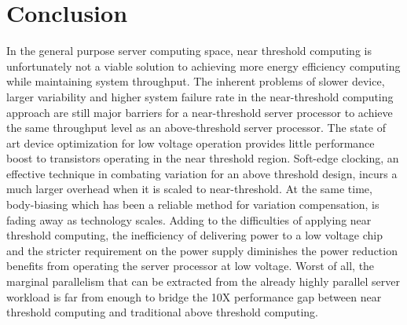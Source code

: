 \section{Conclusion}
In the general purpose server computing space, near threshold computing is unfortunately not a viable solution to achieving more energy efficiency computing while maintaining system throughput. The inherent problems of slower device, larger variability and higher system failure rate in the near-threshold computing approach are still major barriers for a near-threshold server processor to achieve the same throughput level as an above-threshold server processor. The state of art device optimization for low voltage operation provides little performance boost to transistors operating in the near threshold region. Soft-edge clocking, an effective technique in combating variation for an above threshold design, incurs a much larger overhead when it is scaled to near-threshold. At the same time, body-biasing which has been a reliable method for variation compensation, is fading away as technology scales. Adding to the difficulties of applying near threshold computing, the inefficiency of delivering power to a low voltage chip and the stricter requirement on the power supply diminishes the power reduction benefits from operating the server processor at low voltage. Worst of all, the marginal parallelism that can be extracted from the already highly parallel server workload is far from enough to bridge the 10X performance gap between near threshold computing and traditional above threshold computing.         